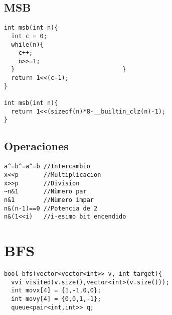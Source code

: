 \documentclass[twoside]{article}
\begin{document}
\begin{multicols*}{2}
\begin{verbatim}
\end{verbatim}

{
\subsection*{MSB}
}
\begin{verbatim}
int msb(int n){
  int c = 0;
  while(n){
    c++;
    n>>=1;
  }                              }
  return 1<<(c-1);
}

int msb(int n){
  return 1<<(sizeof(n)*8-__builtin_clz(n)-1);
}

\end{verbatim}

{
\subsection*{Operaciones}
}
\begin{verbatim}
a^=b^=a^=b //Intercambio
x<<p       //Multiplicacion
x>>p       //Division
~n&1       //Nùmero par
n&1        //Nùmero impar
n&(n-1)==0 //Potencia de 2
n&(1<<i)   //i-esimo bit encendido

\end{verbatim}

{
\section*{BFS}
}
\begin{verbatim}
bool bfs(vector<vector<int>> v, int target){
  vvi visited(v.size(),vector<int>(v.size()));
  int movx[4] = {1,-1,0,0};
  int movy[4] = {0,0,1,-1};  
  queue<pair<int,int>> q;


\end{verbatim}
\end{multicols*}
\end{document}

